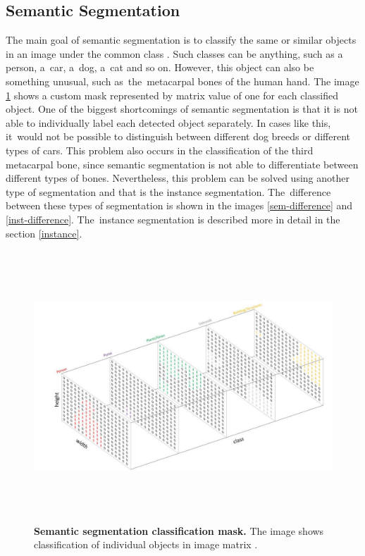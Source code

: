 \subsection{Semantic Segmentation}
The main goal of semantic segmentation is to classify the same or similar objects in an image under the common class \cite{semantic-semgentation, instance-segmentation}. Such classes can be anything, such as a person, a~car, a~dog, a~cat and so on. However, this object can also be something unusual, such as~the~metacarpal bones of the human hand. The image \ref{sem-seg-classes} shows a custom mask represented by matrix value of one for each classified object. One of the biggest shortcomings of semantic segmentation is that it is not able to individually label each detected object separately. In cases like this, it~would not be possible to distinguish between different dog breeds or different types of cars. This problem also occurs in the classification of the third metacarpal bone, since semantic segmentation is not able to differentiate between different types of bones. Nevertheless, this problem can be solved using another type of segmentation and that is the instance  segmentation. The~difference between these types of segmentation is shown in the images \ref{sem-difference} and \ref{inst-difference}. The~instance segmentation is described more in detail in the section \ref{instance}.

\begin{figure}[!ht]
    \centering
    \includegraphics[width=\textwidth, height=4in]{obrazky-figures/semantic_seg_classes.pdf}
    \caption{\textbf{Semantic segmentation classification mask.} The image shows classification of individual objects in image matrix \cite{sem-seg-website}.}
    \label{sem-seg-classes}
\end{figure}

